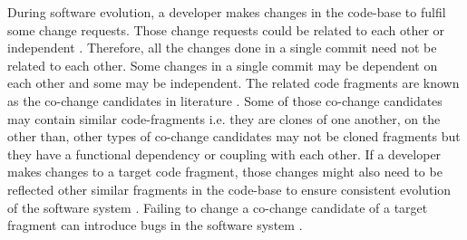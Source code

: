 \documentclass[review]{elsarticle}
\begin{document}

\vspace{0.5mm}
During software evolution, a developer makes changes in the code-base to fulfil some change requests. Those change requests could be related to each other or independent \cite{Mondal:Co-change-recommendation, Mondal:Connectivity:co-changed}. Therefore, all the changes done in a single commit need not be related to each other. Some changes in a single commit may be dependent on each other and some may be independent. The related code fragments are known as the co-change candidates in literature \citep{Mondal-2014-PRC-2597073-2597104rankingCoChange}. Some of those co-change candidates may contain similar code-fragments i.e. they are clones of one another, on the other than, other types of co-change candidates may not be cloned fragments but they have a functional dependency or coupling with each other. If a developer makes changes to a target code fragment, those changes might also need to be reflected other similar fragments in the code-base to ensure consistent evolution of the software system \cite{Mondal:Association:Rules, Mondal:Context:Adaptation:Bugs}. Failing to change a co-change candidate of a target fragment can introduce bugs in the software system \cite{Judith:Bug:Replication, Judith:Micro:Regular:Clone}. 
\end{document}
